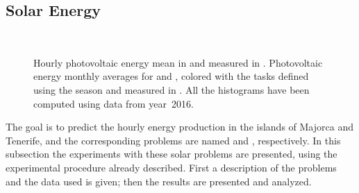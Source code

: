 \subsection{Solar Energy}

\begin{figure}[t!]
    \centering%
    \quad%
    \\
    \quad%
 \caption[Hourly photovoltaic energy mean {in}  {and}  measured in \mwhu{}.]{\label{fig:solar_task_def}Hourly photovoltaic energy mean {in}  {and}  measured in \mwhu{}. Photovoltaic energy monthly averages for  and , colored with the tasks defined using the season and measured in \mwhu{}. All the histograms have been computed using data from year~2016.}
 \end{figure}

The goal is to predict the hourly energy production in the islands of Majorca and Tenerife, and the corresponding problems are named  and , respectively. 
%
In this subsection the experiments with these solar problems are presented, using the experimental procedure already described. First a description of the problems and the data used is given; then the results are presented and analyzed.

